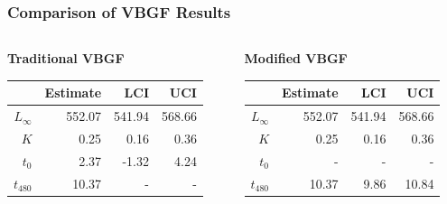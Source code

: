 \documentclass[xcolor=dvipsnames]{beamer}\usepackage[]{graphicx}\usepackage[]{color}
\begin{document}
\begin{frame}[fragile, t]
\frametitle{Comparison of VBGF Results}
\begin{columns}
\begin{column}{0.5\textwidth}
\textbf{Traditional VBGF}
\begin{table}[ht]
\centering
\begin{tabular}{rrrr}
  \hline
 & Estimate & LCI & UCI \\ 
  \hline
$L_{\infty}$ & 552.07 & 541.94 & 568.66 \\ 
  $K$ & 0.25 & 0.16 & 0.36 \\ 
  $t_{0}$ & 2.37 & -1.32 & 4.24 \\ 
  $t_{480}$ & 10.37 & - & - \\ 
   \hline
\end{tabular}
\end{table}

\end{column}
\begin{column}{0.5\textwidth}
\textbf{Modified VBGF}
\begin{table}[ht]
\centering
\begin{tabular}{rrrr}
  \hline
 & Estimate & LCI & UCI \\ 
  \hline
$L_{\infty}$ & 552.07 & 541.94 & 568.66 \\ 
  $K$ & 0.25 & 0.16 & 0.36 \\ 
  $t_{0}$ & - & - & - \\ 
  $t_{480}$ & 10.37 & 9.86 & 10.84 \\ 
   \hline
\end{tabular}
\end{table}

\end{column}
\end{columns}
\end{frame}
\end{document}
